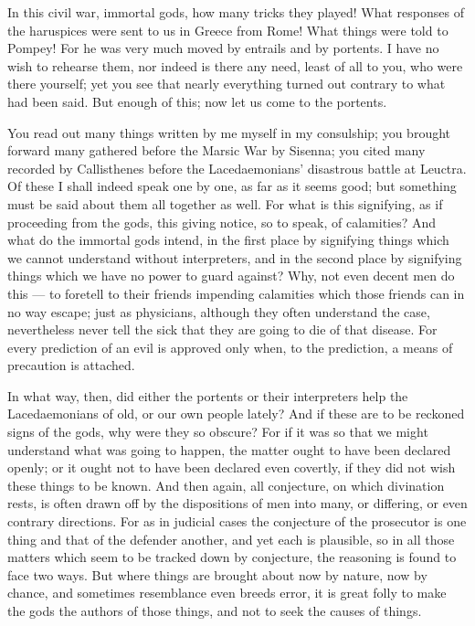  In this civil war, immortal gods, how many tricks they played! What responses of the haruspices were sent to us in Greece from Rome! What things were told to Pompey! For he was very much moved by entrails and by portents. I have no wish to rehearse them, nor indeed is there any need, least of all to you, who were there yourself; yet you see that nearly everything turned out contrary to what had been said. But enough of this; now let us come to the portents.

 You read out many things written by me myself in my consulship; you brought forward many gathered before the Marsic War by Sisenna; you cited many recorded by Callisthenes before the Lacedaemonians' disastrous battle at Leuctra. Of these I shall indeed speak one by one, as far as it seems good; but something must be said about them all together as well. For what is this signifying, as if proceeding from the gods, this giving notice, so to speak, of calamities? And what do the immortal gods intend, in the first place by signifying things which we cannot understand without interpreters, and in the second place by signifying things which we have no power to guard against? Why, not even decent men do this — to foretell to their friends impending calamities which those friends can in no way escape; just as physicians, although they often understand the case, nevertheless never tell the sick that they are going to die of that disease. For every prediction of an evil is approved only when, to the prediction, a means of precaution is attached.

 In what way, then, did either the portents or their interpreters help the Lacedaemonians of old, or our own people lately? And if these are to be reckoned signs of the gods, why were they so obscure? For if it was so that we might understand what was going to happen, the matter ought to have been declared openly; or it ought not to have been declared even covertly, if they did not wish these things to be known. And then again, all conjecture, on which divination rests, is often drawn off by the dispositions of men into many, or differing, or even contrary directions. For as in judicial cases the conjecture of the prosecutor is one thing and that of the defender another, and yet each is plausible, so in all those matters which seem to be tracked down by conjecture, the reasoning is found to face two ways. But where things are brought about now by nature, now by chance, and sometimes resemblance even breeds error, it is great folly to make the gods the authors of those things, and not to seek the causes of things.

